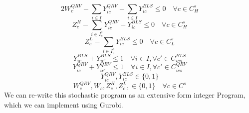 \documentclass[12pt]{report}
\begin{document}
    \begin{equation}
        \label{Wpenalty}
          2W^{QRV}_{c} - \sum_{i \in I} Y^{QRV}_{ic} - \sum_{i \in I}Y^{BLS}_{ic}  \leq 0  \quad \forall c \in C^s_H
    \end{equation}
    \begin{equation}
        \label{covHigh}
        Z^H_{c} - \sum_{i\in I^s_c}Y^{QRV}_{ic} + Y^{BLS}_{ic}  \leq 0 \quad  \forall c \in C^s_H
    \end{equation}
    \begin{equation}
        \label{covLOW}
        Z^L_{c} - \sum_{i\in I^s_c} Y^{BLS}_{ic}  \leq 0 \quad  \forall c \in C^s_L
    \end{equation}
    \begin{equation}
        \label{covLOW}
        Y^{BLS}_{ic} + Y^{BLS}_{ic'} \leq 1 \quad  \forall i \in I, \forall c' \in C^{BLS}_{ics}
    \end{equation}
    \begin{equation}
        \label{covLOW}
        Y^{QRV}_{ic} + Y^{QRV}_{ic'} \leq 1 \quad  \forall i \in I, \forall c' \in C^{QRV}_{ics} 
    \end{equation}
    \begin{equation}
        \label{covLOW}
        Y^{QRV}_{ic}, Y^{BLS}_{ic} \in \{0,1\}
    \end{equation}
    \begin{equation}
        \label{covLOW}
        W^{QRV}_{c}, W_{c}, Z^{H}_{c}, Z^{L}_{c},\in \{0,1\} \quad \forall c \in C^s
    \end{equation}
We can re-write this stochastic program as an extensive form integer Program, which we can implement using Gurobi.
    
\end{document}
